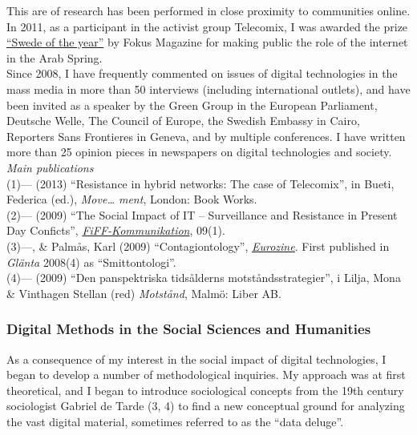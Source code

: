 \documentclass[a4paper,11pt,oneside]{article}
\begin{document}
    This are of research has been performed in close proximity to communities online.
    In 2011, as a participant in the activist group Telecomix, I was
    awarded the prize \href{http://www.fokus.se/2011/12/med-datorn-som-vapen/}{``Swede of the year''} by Fokus Magazine
    for making public the role of the internet in the Arab Spring. \\

    Since 2008, I have frequently commented on issues of digital technologies
    in the mass media in more than 50 interviews (including international outlets), and have been invited as a speaker by
    the Green Group in the European Parliament, Deutsche Welle, The Council of Europe,
    the Swedish Embassy in Cairo, Reporters Sans Frontieres in Geneva, and by multiple conferences.
    I have written more than 25 opinion pieces in newspapers on digital technologies and society.\\

      \noindent  \emph{Main publications} \\
      (1)--- (2013) ``Resistance in hybrid networks: The case of Telecomix'', in Bueti, Federica (ed.), \emph{Move… ment}, London: Book Works.\\
      (2)--- (2009) ``The Social Impact of IT – Surveillance and Resistance in Present Day Conficts'', \href{http://www.fiff.de/publikationen/fiff-kommunikation/fk-2009/fiff-ko-1-2009/fiko_1_2009_kullenberg.pdf}{\emph{FiFF-Kommunikation}}, 09(1).\\
      (3)---, \& Palmås, Karl (2009) ``Contagiontology'', \href{http://www.eurozine.com/articles/2009-03-09-kullenberg-en.html}{\emph{Eurozine}}. First published in \emph{Glänta} 2008(4) as ``Smittontologi''.\\
      (4)--- (2009) ``Den panspektriska tidsålderns motståndsstrategier'', i Lilja, Mona \& Vinthagen Stellan (red) \emph{Motstånd}, Malmö: Liber AB.\\


    \subsubsection{Digital Methods in the Social Sciences and Humanities}
    As a consequence of my interest in the social impact of digital technologies,
    I began to develop a number of methodological inquiries. My approach was
    at first theoretical, and I began to introduce sociological concepts from the
    19th century sociologist Gabriel de Tarde (3, 4) to find a new conceptual
    ground for analyzing the vast digital material, sometimes referred to as the
    ``data deluge''.\\
\end{document}
